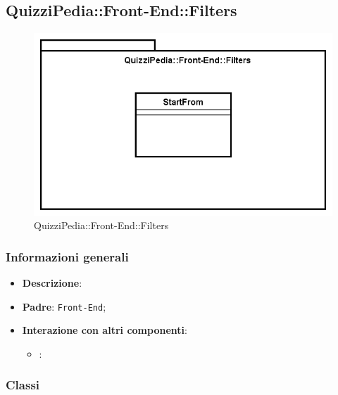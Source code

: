 \newpage
\subsection{QuizziPedia::Front-End::Filters}


\begin{figure} [ht]
	\centering
	\includegraphics[scale=0.42]{UML/Package/QuizziPedia_Front-End_Filters.png}
	\caption{QuizziPedia::Front-End::Filters}
\end{figure} \FloatBarrier

\subsubsection{Informazioni generali}
\begin{itemize}
	\item \textbf{Descrizione}: 
	\item \textbf{Padre}: \texttt{Front-End};
	\item \textbf{Interazione con altri componenti}:
	\begin{itemize}
		\item \texttt{}:
	\end{itemize} 
\end{itemize}
\subsubsection{Classi}


